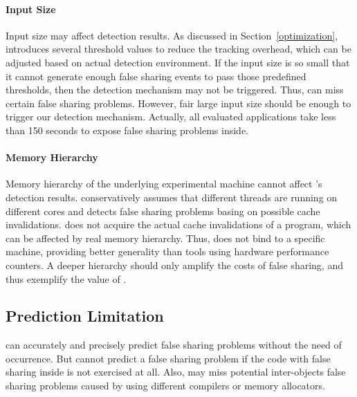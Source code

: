 \paragraph{Input Size} Input size may affect detection results.  As discussed in Section~\ref{optimization}, \Predator{} introduces several threshold values to reduce the tracking overhead, which can be adjusted based on actual detection environment. If the input size is so small that it cannot generate enough false sharing events to pass those predefined thresholds, then the detection mechanism may not be triggered. Thus, \Predator{} can miss certain false sharing problems. However, fair large input size should be enough to trigger our detection mechanism. Actually, all evaluated applications take less than 150 seconds to expose false sharing problems inside. 

\paragraph{Memory Hierarchy} Memory hierarchy of the underlying experimental machine cannot affect \Predator{}'s detection results. \Predator{} conservatively assumes that different threads are running on different cores and detects false sharing problems basing on possible cache invalidations. \Predator{} does not acquire the actual cache invalidations of a program, which can be affected by real memory hierarchy. Thus, \Predator{} does not bind to a specific machine, providing better generality than tools using hardware performance counters. A deeper hierarchy should only amplify the costs of false sharing, and thus exemplify the value of \Predator{}.

\subsection{Prediction Limitation} 
\Predator{} can accurately and precisely predict false sharing problems without the need of occurrence. But \Predator{} cannot  predict a false sharing problem if the code with false sharing inside is not exercised at all. Also, \Predator{} may miss potential inter-objects false sharing problems caused by using different compilers or memory allocators. 